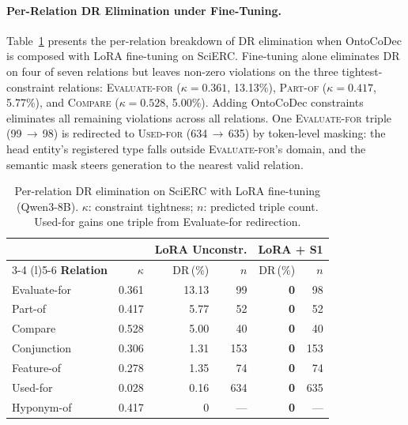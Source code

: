
\paragraph{Per-Relation DR Elimination under Fine-Tuning.}
\label{app:lora-per-relation}

Table~\ref{tab:lora-per-relation} presents the per-relation breakdown of DR elimination when OntoCoDec is composed with LoRA fine-tuning on SciERC.
Fine-tuning alone eliminates DR on four of seven relations but leaves non-zero violations on the three tightest-constraint relations: \textsc{Evaluate-for} ($\kappa{=}0.361$, 13.13\%), \textsc{Part-of} ($\kappa{=}0.417$, 5.77\%), and \textsc{Compare} ($\kappa{=}0.528$, 5.00\%).
Adding OntoCoDec constraints eliminates all remaining violations across all relations.
One \textsc{Evaluate-for} triple (99\,$\to$\,98) is redirected to \textsc{Used-for} (634\,$\to$\,635) by token-level masking: the head entity's registered type falls outside \textsc{Evaluate-for}'s domain, and the semantic mask steers generation to the nearest valid relation.

\begin{table}[t]
\centering
\small
\begin{tabular}{@{}l r rr rr@{}}
\toprule
& & \multicolumn{2}{c}{\textbf{LoRA Unconstr.}} & \multicolumn{2}{c}{\textbf{LoRA + S1}} \\
\cmidrule(lr){3-4} \cmidrule(l){5-6}
\textbf{Relation} & $\kappa$ & DR\,(\%) & $n$ & DR\,(\%) & $n$ \\
\midrule
Evaluate-for & 0.361 & 13.13 & 99 & \textbf{0} & 98 \\
Part-of      & 0.417 & 5.77  & 52 & \textbf{0} & 52 \\
Compare      & 0.528 & 5.00  & 40 & \textbf{0} & 40 \\
Conjunction  & 0.306 & 1.31  & 153 & \textbf{0} & 153 \\
Feature-of   & 0.278 & 1.35  & 74 & \textbf{0} & 74 \\
Used-for     & 0.028 & 0.16  & 634 & \textbf{0} & 635 \\
Hyponym-of   & 0.417 & 0     & --- & \textbf{0} & --- \\
\bottomrule
\end{tabular}
\caption{Per-relation DR elimination on SciERC with LoRA fine-tuning (Qwen3-8B).
$\kappa$: constraint tightness; $n$: predicted triple count.
Used-for gains one triple from Evaluate-for redirection.}
\label{tab:lora-per-relation}
\end{table}

